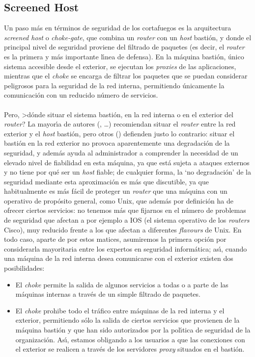 \subsection{Screened Host}
Un paso m\'as en t\'erminos de seguridad de los cortafuegos es la arquitectura
{\it screened host} o {\it choke-gate}, que combina un {\it router} con un {\it
host} basti\'on, y donde el principal nivel de seguridad proviene del filtrado
de paquetes (es decir, el {\it router} es la primera y m\'as importante 
l\'{\i}nea de defensa). En la m\'aquina basti\'on, \'unico sistema accesible 
desde el 
exterior, se ejecutan los {\it proxies} de las aplicaciones, mientras que 
el {\it choke} se encarga de filtrar los paquetes que se
puedan considerar peligrosos para la seguridad de la red interna, permitiendo
\'unicamente la comunicaci\'on con un reducido n\'umero de servicios.\\
\\Pero, >d\'onde situar el sistema basti\'on, en la red interna o en el 
exterior del {\it router}? La mayor\'{\i}a de autores (\cite{kn:ran93}, 
\cite{kn:sem96}\ldots) recomiendan situar el {\it router} entre la red exterior
y el {\it host} basti\'on, pero otros (\cite{kn:wack94}) defienden justo lo
contrario: situar el basti\'on en la red exterior no provoca aparentemente una
degradaci\'on de la seguridad, y adem\'as ayuda al administrador a comprender
la necesidad de un elevado nivel de fiabilidad en esta m\'aquina, ya que est\'a
sujeta a ataques externos y no tiene por qu\'e ser un {\it host} fiable; de
cualquier forma, la `no degradaci\'on' de la seguridad mediante esta 
aproximaci\'on es m\'as que discutible, ya que habitualmente es m\'as f\'acil
de proteger un {\it router} que una m\'aquina con un operativo de prop\'osito
general, como Unix, que adem\'as por definici\'on ha de ofrecer ciertos 
servicios: no tenemos m\'as que fijarnos en el n\'umero de problemas
de seguridad que afectan a por ejemplo a IOS (el sistema operativo de los {\it
routers} Cisco), muy reducido frente a los que afectan a diferentes {\it 
flavours} de Unix. En todo caso, aparte de por estos matices, asumiremos la 
primera opci\'on por considerarla mayoritaria entre los expertos en seguridad 
inform\'atica; as\'{\i}, cuando una m\'aquina de la red interna desea 
comunicarse con el exterior existen dos posibilidades:
\begin{itemize}
\item El {\it choke} permite la salida de algunos servicios a todas o a parte
de las m\'aquinas internas a trav\'es de un simple filtrado de paquetes.
\item El {\it choke} prohibe todo el tr\'afico entre m\'aquinas de la red 
interna y el exterior, permitiendo s\'olo la salida de ciertos servicios que
provienen de la m\'aquina basti\'on y que han sido autorizados por la 
pol\'{\i}tica de seguridad de la organizaci\'on. As\'{\i}, estamos obligando a 
los usuarios a que las conexiones con el exterior se realicen a trav\'es de los 
servidores {\it proxy} situados en el basti\'on.
\end{itemize}
